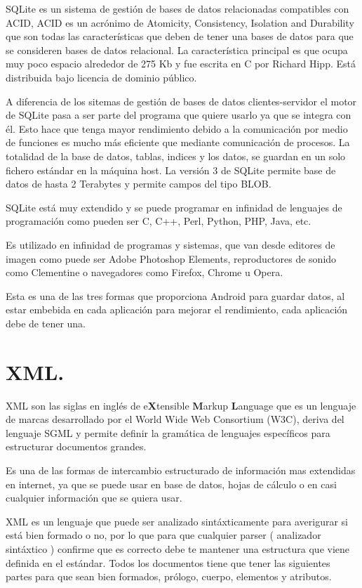 SQLite es un sistema de gestión de bases de datos relacionadas compatibles con ACID, ACID es un acrónimo de Atomicity, Consistency, Isolation and Durability que son todas las características que deben de tener una bases de datos para que se consideren bases de datos relacional. La característica principal es que ocupa muy poco espacio alrededor de 275 Kb y fue escrita en C por Richard Hipp. Está distribuida bajo licencia de dominio público.

A diferencia de los sitemas de gestión de bases de datos clientes-servidor el motor de SQLite pasa a ser parte del programa que quiere usarlo ya que se integra con él. Esto hace que tenga mayor rendimiento debido a la comunicación por medio de funciones es mucho más eficiente que mediante comunicación de procesos. La totalidad de la base de datos, tablas, indices y los datos, se guardan en un solo fichero estándar en la máquina host. La versión 3 de SQLite permite base de datos de hasta 2 Terabytes y permite campos del tipo BLOB.

SQLite está muy extendido y se puede programar en infinidad de lenguajes de programación como pueden ser C, C++, Perl, Python, PHP, Java, etc.

Es utilizado en infinidad de programas y sistemas, que van desde editores de imagen como puede ser Adobe Photoshop Elements, reproductores de sonido como Clementine o navegadores como Firefox, Chrome u Opera.

Esta es una de las tres formas que proporciona Android para guardar datos, al estar embebida en cada aplicación para mejorar el rendimiento, cada aplicación debe de tener una. 

\section{XML.}

XML son las siglas en inglés de e\textbf{X}tensible \textbf{M}arkup \textbf{L}anguage que es un lenguaje de marcas desarrollado por el World Wide Web Consortium (W3C), deriva del lenguaje SGML y permite definir la gramática de lenguajes específicos para estructurar documentos grandes.

Es una de las formas de intercambio estructurado de información mas extendidas en internet, ya que se puede usar en base de datos, hojas de cálculo o en casi cualquier información que se quiera usar.

XML es un lenguaje que puede ser analizado sintáxticamente para averigurar si está bien formado o no, por lo que para que cualquier parser ( analizador sintáxtico ) confirme que es correcto debe te mantener una estructura que viene definida en el estándar. Todos los documentos tiene que tener las siguientes partes para que sean bien formados, prólogo, cuerpo, elementos y atributos.

